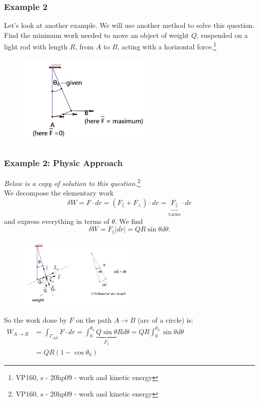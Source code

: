 \documentclass[11pt, t]{beamer}
\newcommand{\nullspace}{~\\[15pt]}
\begin{document}
\begin{frame}
    \frametitle{Example 2}
    Let's look at another example. We will use another method to solve this question.\\[8pt]
    Find the minimum work needed to move an object of weight $Q$, suspended on a light rod with length $R$, from $A$ to $B$, acting with a horizontal force.\footnote[frame]{VP160, s - 20hp09 - work and kinetic energy}
    \begin{figure}[H]
        \centering
        \includegraphics[width=0.6\textwidth]{2020-07-15-20-08-55.png}
    \end{figure}
\end{frame}

\begin{frame}[allowframebreaks]
    \frametitle{Example 2: Physic Approach}
    \textit{Below is a copy of solution to this question.}\footnote[frame]{VP160, s - 20hp09 - work and kinetic energy}\nullspace
    We decompose the elementary work
    $$\delta W=F \cdot d r=\left(F_{\|}+F_{\perp}\right) \cdot d r=\underbrace{F_{\|}}_{\text {varies}} \cdot d r$$ and express everything in terms of $\theta$. We find
    $$\delta W=F_\parallel|dr|=QR\sin\theta d\theta.$$
    \begin{figure}[H]
        \centering
        \includegraphics[width=0.5\textwidth]{2020-07-15-20-13-20.png}
    \end{figure}
    So the work done by $F$ on the path $A\to B$ (arc of a circle) is:
    $\begin{aligned}
            W_{A \rightarrow B} & =\int_{\Gamma_{A B}} F \cdot d r=\int_{0}^{\theta_{0}} \underbrace{Q \sin \theta}_{F_{\|}} R d \theta=Q R \int_{0}^{\theta_{0}} \sin \theta d \theta \\
                                & =Q R\left(1-\cos \theta_{0}\right)
        \end{aligned}$

\end{frame}
\end{document}
